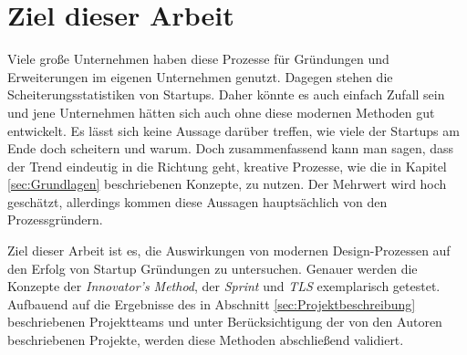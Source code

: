\section{Ziel dieser Arbeit}
Viele große Unternehmen haben diese Prozesse für Gründungen und Erweiterungen im eigenen Unternehmen genutzt. Dagegen stehen die Scheiterungsstatistiken von Startups. Daher könnte es auch einfach Zufall sein und jene Unternehmen hätten sich auch ohne diese modernen Methoden gut entwickelt. Es lässt sich keine Aussage darüber treffen, wie viele der Startups am Ende doch scheitern und warum. Doch zusammenfassend kann man sagen, dass der Trend eindeutig in die Richtung geht, kreative Prozesse, wie die in Kapitel \ref{sec:Grundlagen} beschriebenen Konzepte, zu nutzen. Der Mehrwert wird hoch geschätzt, allerdings kommen diese Aussagen hauptsächlich von den Prozessgründern.

Ziel dieser Arbeit ist es, die Auswirkungen von modernen Design-Prozessen auf den Erfolg von Startup Gründungen zu untersuchen. Genauer werden die Konzepte der \textit{Innovator's Method}, der \textit{Sprint} und \textit{\ac{TLS}} exemplarisch getestet. Aufbauend auf die Ergebnisse des in Abschnitt \ref{sec:Projektbeschreibung} beschriebenen Projektteams und unter Berücksichtigung der von den Autoren beschriebenen Projekte, werden diese Methoden abschließend validiert. 